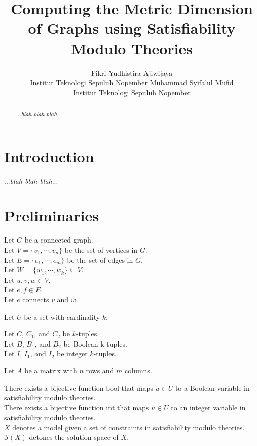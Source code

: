 \documentclass{article}
\title{Computing the Metric Dimension of Graphs using Satisfiability Modulo Theories}
\author{
	Fikri Yudhistira Ajiwijaya \\
	Institut Teknologi Sepuluh Nopember
	\And
	Muhammad Syifa'ul Mufid \\
	Institut Teknologi Sepuluh Nopember
}
\begin{document}
	\maketitle

	\begin{abstract}
		...\textit{blah blah blah}...
	\end{abstract}

	\section{Introduction}

	...\textit{blah blah blah}...

	\section{Preliminaries}

	Let \(G\) be a connected graph. \\
	Let \(V = \{v_1, \cdots, v_n\}\) be the set of vertices in \(G\). \\
	Let \(E = \{e_1, \cdots, e_m\}\) be the set of edges in \(G\). \\
	Let \(W = \{w_1, \cdots, w_k\} \subseteq V\). \\
	Let \(u, v, w \in V\). \\
	Let \(e, f \in E\). \\
	Let \(e\) connects \(v\) and \(w\).

	Let \(U\) be a set with cardinality \(k\).

	Let \(C\), \(C_1\), and \(C_2\) be \(k\)-tuples. \\
	Let \(B\), \(B_1\), and \(B_2\) be Boolean k-tuples. \\
	Let \(I\), \(I_1\), and \(I_2\) be integer \(k\)-tuples.

	Let \(A\) be a matrix with \(n\) rows and \(m\) columns.

	\clearpage

	There exists a bijective function \(\mathrm{bool}\) that maps \(u \in U\) to a Boolean variable in satisfiability modulo theories. \\
	There exists a bijective function \(\mathrm{int}\) that maps \(u \in U\) to an integer variable in satisfiability modulo theories. \\
	\(X\) denotes a model given a set of constraints in satisfiability modulo theories. \\
	\(\mathcal{S}(X)\) detones the solution space of \(X\).
\end{document}
